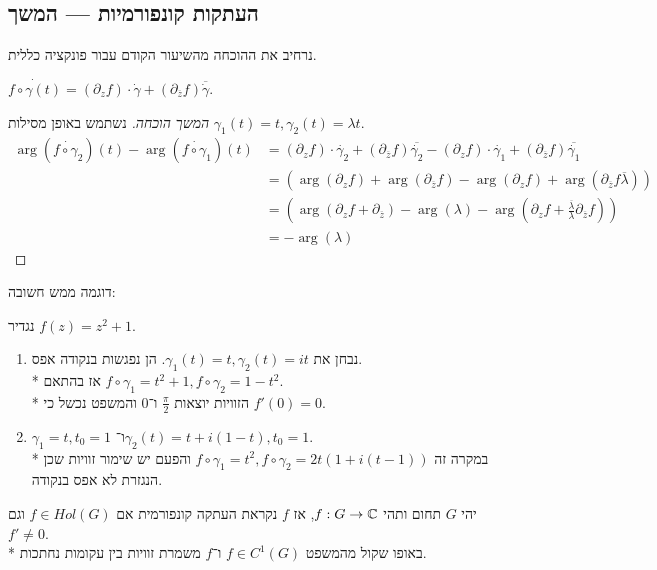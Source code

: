 \subsection{העתקות קונפורמיות --- המשך}
נרחיב את ההוכחה מהשיעור הקודם עבור פונקציה כללית.
\begin{exercise}
	$\dot{f \circ \gamma(t)} = (\partial_z f) \cdot \dot{\gamma} + (\partial_{\overline{z}} f) \overline{\dot{\gamma}}$.
\end{exercise}
\begin{proof}[המשך הוכחה]
	נשתמש באופן מסילות $\gamma_1(t) = t, \gamma_2(t) = \lambda t$.
	\begin{align*}
		\arg(\dot{f \circ \gamma_2})(t) - \arg(\dot{f \circ \gamma_1})(t)
		& = (\partial_z f) \cdot \dot{\gamma_2} + (\partial_{\overline{z}} f) \overline{\dot{\gamma_2}} - (\partial_z f) \cdot \dot{\gamma_1} + (\partial_{\overline{z}} f) \overline{\dot{\gamma_1}} \\
		& = (\arg(\partial_z f) + \arg(\partial_{\overline{z}} f) - \arg(\partial_z f) + \arg(\partial_{\overline{z}} f \overline{\lambda})) \\
		& = (\arg(\partial_z f + \partial_{\overline{z}}) - \arg(\lambda) - \arg(\partial_z f + \frac{\overline{\lambda}}{\lambda} \partial_{\overline{z}} f)) \\
		& = - \arg(\lambda)
	\end{align*}
\end{proof}
דוגמה ממש חשובה:
\begin{example}
	נגדיר $f(z) = z^2 + 1$.
	\begin{enumerate}
		\item נבחן את $\gamma_1(t) = t, \gamma_2(t) = i t$.
			הן נפגשות בנקודה אפס. \\*
			אז בהתאם $f \circ \gamma_1 = t^2 + 1, f \circ \gamma_2 = 1 - t^2$. \\*
			הזוויות יוצאות $\frac{\pi}{2}$ ו־$0$ והמשפט נכשל כי  $f'(0) = 0$.
		\item $\gamma_1 = t, t_0 = 1$ ו־$\gamma_2(t) = t + i(1 - t), t_0 = 1$. \\*
			במקרה זה $f \circ \gamma_1 = t^2, f \circ \gamma_2 = 2t (1 + i(t - 1))$ והפעם יש שימור זוויות שכן הנגזרת לא אפס בנקודה.
	\end{enumerate}
\end{example}
\begin{definition}
	יהי $G$ תחום ותהי $f : G \to \mathbb{C}$,
	אז $f$ נקראת העתקה קונפורמית אם $f \in Hol(G)$ וגם $f' \ne 0$. \\*
	באופו שקול מהמשפט $f \in C^1(G)$ ו־$f$ משמרת זוויות בין עקומות נחתכות.
\end{definition}
